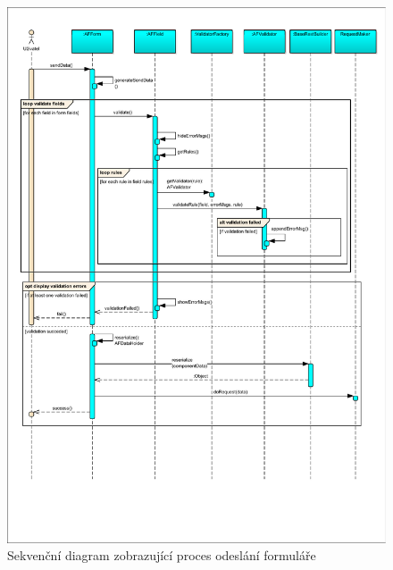 \begin{figure}
\begin{center}
\includegraphics[width=\textwidth, height=\textheight, keepaspectratio]{figures/sequenceSendForm}
\caption{Sekvenční diagram zobrazující proces odeslání formuláře}
\label{img:sdFormSend}
\end{center}
\end{figure}

